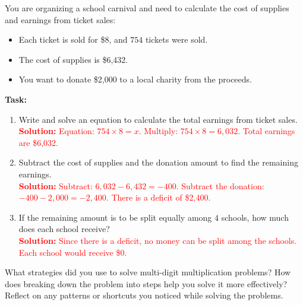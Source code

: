 \documentclass[12pt]{article}
\begin{document}
\begin{tcolorbox}[colframe=black!60, colback=white, 
coltitle=black, colbacktitle=black!15, fonttitle=\bfseries\Large, 
title=Performance Task: Planning a School Carnival, halign title=center, left=10pt, right=10pt, top=10pt, bottom=50pt]
You are organizing a school carnival and need to calculate the cost of supplies and earnings from ticket sales:
\begin{itemize}
    \item Each ticket is sold for \$8, and \( 754 \) tickets were sold.
    \item The cost of supplies is \$6,432.
    \item You want to donate \$2,000 to a local charity from the proceeds.
\end{itemize}
\textbf{Task:}
\begin{enumerate}[itemsep=3em]
    \item Write and solve an equation to calculate the total earnings from ticket sales.\\
    \textcolor{red}{\textbf{Solution:} Equation: \(754 \times 8 = x\). Multiply: \(754 \times 8 = 6,032\). Total earnings are \$6,032.}
    
    \item Subtract the cost of supplies and the donation amount to find the remaining earnings.\\
    \textcolor{red}{\textbf{Solution:} Subtract: \(6,032 - 6,432 = -400\). Subtract the donation: \(-400 - 2,000 = -2,400\). There is a deficit of \$2,400.}
    
    \item If the remaining amount is to be split equally among \( 4 \) schools, how much does each school receive?\\
    \textcolor{red}{\textbf{Solution:} Since there is a deficit, no money can be split among the schools. Each school would receive \$0.}
\end{enumerate}
\end{tcolorbox}

\begin{tcolorbox}[colframe=black!60, colback=white, 
coltitle=black, colbacktitle=black!15, fonttitle=\bfseries\Large, 
title=Reflection, halign title=center, left=10pt, right=10pt, top=10pt, bottom=80pt]
What strategies did you use to solve multi-digit multiplication problems? How does breaking down the problem into steps help you solve it more effectively? Reflect on any patterns or shortcuts you noticed while solving the problems.
\end{tcolorbox}
\end{document}
